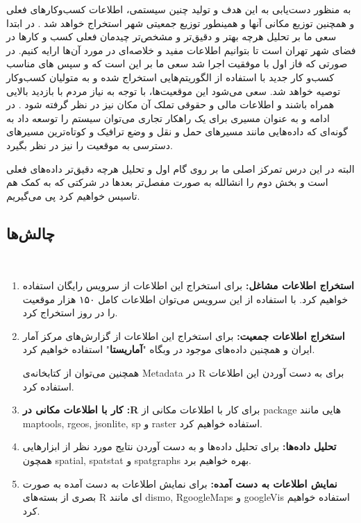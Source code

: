به منظور دست‌یابی به این هدف و تولید چنین سیستمی، اطلاعات کسب‌وکار‌های فعلی و همچنین توزیع مکانی‌ آنها و همینطور توزیع جمعیتی شهر استخراج خواهد شد
.
در ابتدا سعی ما بر تحلیل هرچه بهتر و دقیق‌تر و مشخص‌تر چیدمان فعلی کسب و کارها در فضای شهر تهران است تا بتوانیم اطلاعات مفید و خلاصه‌‌ای در مورد آن‌ها ارایه کنیم.
در صورتی که فاز اول با موفقیت اجرا شد سعی ما بر این است که 
و سپس 
‌های مناسب کسب‌و کار جدید با  استفاده از الگوریتم‌هایی استخراج شده و به متولیان کسب‌وکار توصیه خواهد شد. سعی می‌شود این موقعیت‌ها، با توجه به نیاز مردم با بازدید بالایی همراه باشند و اطلاعات مالی و حقوقی  تملک آن مکان نیز در نظر گرفته شود
.
در ادامه و به عنوان مسیری برای یک راهکار تجاری می‌توان سیستم را توسعه داد به گونه‌ای که داده‌هایی مانند مسیر‌های حمل و نقل و وضع ترافیک و کوتاه‌ترین مسیر‌های دسترسی به موقعیت را نیز در نظر بگیرد.

البته در این درس تمرکز اصلی ما بر روی گام اول و تحلیل هرچه دقیق‌تر داده‌های فعلی است و بخش دوم را انشالله به صورت مفصل‌تر‌ بعد‌ها در شرکتی که به کمک هم تاسیس خواهیم کرد پی می‌گیریم.

\vspace*{1cm}

\subsection*{چالش‌ها}\ \\

\begin{enumerate}
\item 
\textbf{استخراج اطلاعات مشاغل:}
\newline
برای استخراج این اطلاعات از سرویس رایگان
استفاده خواهیم کرد. با استفاده از این سرویس می‌توان اطلاعات کامل ۱۵۰ هزار موقعیت را در روز
استخراج کرد.
\item 
\textbf{استخراج اطلاعات جمعیت:}
\newline
برای استخراج این اطلاعات از گزارش‌های مرکز آمار ایران و همچنین داده‌های موجود در وبگاه "\textbf{آماریستا}" استفاده خواهیم کرد.

همچنین می‌توان از کتابخانه‌ی Metadata در R برای به دست آوردن این اطلاعات استفاده کرد.
\item 
\textbf{کار با اطلاعات مکانی در :R}
\newline
برای کار با اطلاعات مکانی از package هایی مانند
maptools,
rgeos,
jsonlite,
sp
و
raster
استفاده خواهیم کرد.

\item 
\textbf{تحلیل داده‌ها:}
\newline
برای تحلیل داده‌ها و به دست آوردن نتایج مورد نظر از ابزار‌هایی همچون
spatial,
spatstat
و
spatgraphs
بهره خواهیم برد.


\item 
\textbf{نمایش اطلاعات به دست آمده:}
\newline
برای نمایش اطلاعات به دست آمده به صورت بصری از بسته‌های R ای مانند
dismo,
RgoogleMaps
و
googleVis
استفاده خواهیم کرد.


\end{enumerate}

